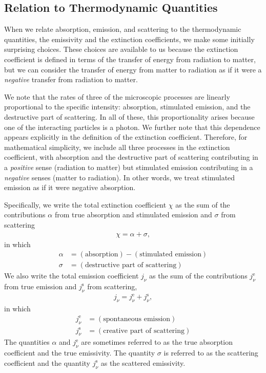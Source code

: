 \newslide

\subsection{Relation to Thermodynamic Quantities}

When we relate absorption, emission, and scattering to the thermodynamic quantities, the emissivity and the extinction coefficients, we make some initially surprising choices. These choices are available to us because the extinction coefficient is defined in terms of the transfer of energy from radiation to matter, but we can consider the transfer of energy from matter to radiation as if it were a \emph{negative} transfer from radiation to matter.

We note that the rates of three of the microscopic processes are linearly proportional to the specific intensity: absorption, stimulated emission, and the destructive part of scattering. In all of these, this proportionality arises because one of the interacting particles is a photon. We further note that this dependence appears explicitly in the definition of the extinction coefficient. Therefore, for mathematical simplicity, we include all three processes in the extinction coefficient, with absorption and the destructive part of scattering contributing in a \emph{positive} sense (radiation to matter) but stimulated emission contributing in a \emph{negative} senses (matter to radiation). In other words, we treat stimulated emission as if it were negative absorption.

\newslide

Specifically, we
write the total extinction coefficient $\chi$ as the sum of
the contributions $\alpha$ from true absorption and stimulated emission and $\sigma$
from scattering
\begin{align}
\chi = \alpha + \sigma,
\end{align}
in which
\begin{align}
\alpha &= (\mbox{absorption}) - (\mbox{stimulated emission})\\
\sigma &= (\mbox{destructive part of scattering})
\end{align}
We also write the total emission coefficient $j_\nu$ as
the sum of the contributions $j_\nu^\mathrm{e}$ from true
emission and $j_\nu^\mathrm{s}$ from scattering,
\begin{align}
j_\nu = j_\nu^\mathrm{e} + j_\nu^\mathrm{s},
\end{align}
in which
\begin{align}
j_\nu^\mathrm{e} &= (\mbox{spontaneous emission})\\
j_\nu^\mathrm{s} &= (\mbox{creative part of scattering})
\end{align}
The quantities $\alpha$ and
$j_\nu^\mathrm{e}$ are sometimes referred to as the true absorption
coefficient and the true emissivity. The quantity $\sigma$ is referred to as the scattering coefficient
and the quantity $j_\nu^\mathrm{s}$ as the scattered emissivity. 

